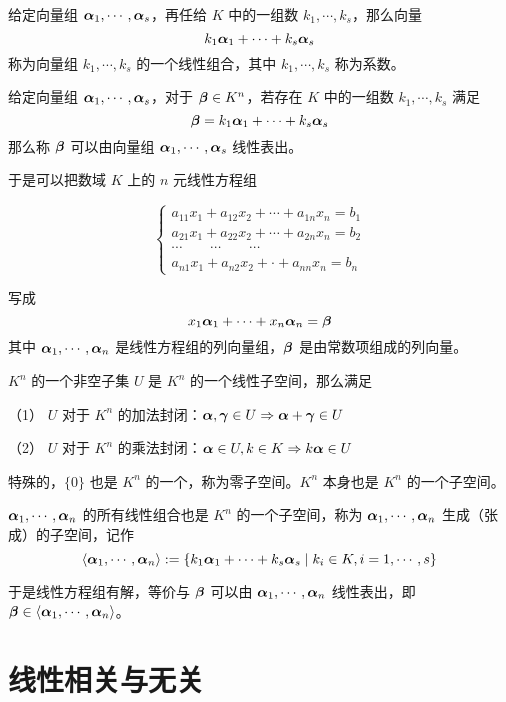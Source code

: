 \begin{definition}[线性组合]
	给定向量组 $\boldsymbol{\alpha}_1,\cdots,\boldsymbol{\alpha}_s$，再任给 $K$ 中的一组数 $k_1,\cdots,k_s$，那么向量
	$$k_1 \boldsymbol{\alpha}_1+\cdots+k_s \boldsymbol{\alpha}_s$$
	称为向量组 $k_1,\cdots,k_s$ 的一个线性组合，其中 $k_1,\cdots,k_s$ 称为系数。
\end{definition}

\begin{definition}[线性表出]
	给定向量组 $\boldsymbol{\alpha}_1,\cdots,\boldsymbol{\alpha}_s$，对于 $\boldsymbol{\beta} \in K^n$，若存在 $K$ 中的一组数 $k_1,\cdots,k_s$ 满足
	$$\boldsymbol{\beta} = k_1\boldsymbol{\alpha}_1+\cdots+k_s\boldsymbol{\alpha}_s$$
	那么称 $\boldsymbol{\beta}$ 可以由向量组 $\boldsymbol{\alpha}_1,\cdots,\boldsymbol{\alpha}_s$ 线性表出。
\end{definition}

于是可以把数域 $K$ 上的 $n$ 元线性方程组

\begin{equation*}
	\left\{
		\begin{matrix}
			a_{11}x_1+a_{12}x_2+\cdots+a_{1n}x_n=b_1\\
			a_{21}x_1+a_{22}x_2+\cdots+a_{2n}x_n=b_2\\
			\cdots\qquad\cdots\qquad\cdots\\
			a_{n1}x_1+a_{n2}x_2+\cdot +a_{nn}x_n=b_n
		\end{matrix}
	\right.
\end{equation*}

写成
$$x_1\boldsymbol{\alpha}_1+\cdots+x_n\boldsymbol{\alpha}_n=\boldsymbol{\beta}$$
其中 $\boldsymbol{\alpha}_1,\cdots,\boldsymbol{\alpha}_n$ 是线性方程组的列向量组，$\boldsymbol{\beta}$ 是由常数项组成的列向量。

\begin{definition}[线性子空间]
	$K^n$ 的一个非空子集 $U$ 是 $K^n$ 的一个线性子空间，那么满足
	
	（1） $U$ 对于 $K^n$ 的加法封闭：$\boldsymbol{\alpha},\boldsymbol{\gamma}\in U \Rightarrow \boldsymbol{\alpha}+\boldsymbol{\gamma} \in U$

	（2） $U$ 对于 $K^n$ 的乘法封闭：$\boldsymbol{\alpha} \in U,k\in K \Rightarrow k\boldsymbol{\alpha} \in U$
\end{definition}

特殊的，$\{0\}$ 也是 $K^n$ 的一个，称为零子空间。$K^n$ 本身也是 $K^n$ 的一个子空间。

$\boldsymbol{\alpha}_1,\cdots,\boldsymbol{\alpha}_n$ 的所有线性组合也是 $K^n$ 的一个子空间，称为 $\boldsymbol{\alpha}_1,\cdots,\boldsymbol{\alpha}_n$ 生成（张成）的子空间，记作
$$\langle \boldsymbol{\alpha}_1,\cdots,\boldsymbol{\alpha}_n\rangle:=\{k_1\boldsymbol{\alpha}_1+\cdots+k_s\boldsymbol{\alpha}_s \mid k_i\in K,i=1,\cdots,s\}$$

于是线性方程组有解，等价与 $\boldsymbol{\beta}$ 可以由 $\boldsymbol{\alpha}_1,\cdots,\boldsymbol{\alpha}_n$ 线性表出，即 $\boldsymbol{\beta} \in \langle\boldsymbol{\alpha}_1,\cdots,\boldsymbol{\alpha}_n\rangle$。

\section{线性相关与无关}

